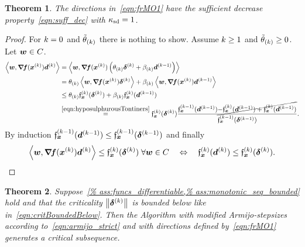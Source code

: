 \documentclass{article}
\theoremstyle{plain}
\newtheorem{theorem}{Theorem}
\theoremstyle{definition}
\begin{document}
\begin{theorem}
	The directions in~\eqref{eqn:frMO1}
	have the sufficient decrease property~\eqref{eqn:suff_dec}
	with $\kappa_{\mathrm{sd}} = 1$.
\end{theorem}

\begin{proof}
	For $k=0$ and $\tilde\theta_{(k)}$ there is nothing
	to show.
	Assume $k \geq 1$ and $\tilde\theta_{(k)} \geq 0$.
	Let $\bm{w}\in C$.
	\begin{align*}
		\left\langle 
			\bm{w}
		, 
			\bm{\nabla}\!\bm{f}(\bm{x}^{(k)})
			\bm{d}^{(k)}
		 \right\rangle
		&=
		\left\langle \bm{w}, 
			\bm{\nabla}\!\bm{f}(\bm{x}^{(k)})
			\left(\theta_{(k)}\bm{\delta}^{(k)} + \beta_{(k)} \bm{d}^{(k-1)}\right)
		 \right\rangle
		\\
		&= 
		\theta_{(k)}\left\langle \bm{w}, \bm{\nabla}\!\bm{f}(\bm{x}^{(k)})\bm{\delta}^{(k)} \right\rangle
		+
		\beta_{(k)}\left\langle \bm{w}, \bm{\nabla}\!\bm{f}(\bm{x}^{(k)})\bm{d}^{(k-1)} \right\rangle
		\\
		&\leq
		\theta_{(k)}\mathfrak{f}_{\bm{x}}^{(k)}(\bm{\delta}^{(k)})
		+
		\beta_{(k)}\mathfrak{f}_{\bm{x}}^{(k)}(\bm{d}^{(k-1)})
		\\
		&\stackrel{\eqref{eqn:hyposulphurousTontiners}}=
		\mathfrak{f}_{\bm{x}}^{(k)}(\bm{\delta}^{(k)})
		\frac{
			\mathfrak{f}_{\bm{x}}^{(k-1)}(\bm{d}^{(k-1)})
			\cancel{
			-\mathfrak{f}_{\bm{x}}^{(k)}(\bm{d}^{(k-1)})
			+\mathfrak{f}_{\bm{x}}^{(k)}(\bm{d}^{(k-1)})
			}
		}{\mathfrak{f}_{\bm{x}}^{(k-1)}(\bm{\delta}^{(k-1)})}
		.
	\end{align*}
	By induction $\mathfrak{f}_{\bm{x}}^{(k-1)}(\bm{d}^{(k-1)}) \leq \mathfrak{f}_{\bm{x}}^{(k-1)}(\bm{\delta}^{(k-1)})$
	and finally
	$$
	\left\langle 
		\bm{w}
		, 
			\bm{\nabla}\!\bm{f}(\bm{x}^{(k)})
			\bm{d}^{(k)}
		 \right\rangle
	\leq
	\mathfrak{f}_{\bm{x}}^{(k)}(\bm{\delta}^{(k)})
	\;\forall \bm{w}\in C
	\quad\Leftrightarrow\quad
	\mathfrak{f}_{\bm{x}}^{(k)}(\bm{d}^{(k)}) \leq \mathfrak{f}_{\bm{x}}^{(k)}(\bm{\delta}^{(k)}).
	$$
\end{proof}

\begin{theorem}%
	\label{thm:frMO1convergence}
	Suppose~\cref{%
	ass:funcs_differentiable,%
	ass:monotonic_seq_bounded}
	hold and that the criticality $\left\|\bm{\delta}^{(k)}\right\|$ is 
	bounded below like in~\eqref{eqn:critBoundedBelow}.
	Then the Algorithm with modified Armijo-stepsizes
	according to~\eqref{eqn:armijo_strict} and with directions defined
	by~\eqref{eqn:frMO1} generates a critical subsequence.
\end{theorem}
\end{document}
